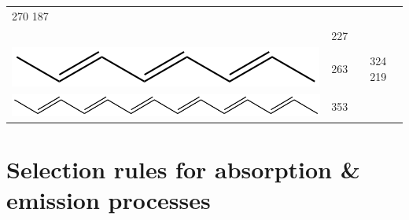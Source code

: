 \documentclass[
]{book}
\begin{document}
\begin{longtable}[]{@{}llll@{}}
\begin{minipage}[t]{0.22\columnwidth}
270 187\strut
\end{minipage}\tabularnewline
\begin{minipage}[t]{0.22\columnwidth}\raggedright
\strut
\end{minipage} & \begin{minipage}[t]{0.22\columnwidth}\raggedright
227\strut
\end{minipage} & \begin{minipage}[t]{0.22\columnwidth}\raggedright
\strut
\end{minipage} & \begin{minipage}[t]{0.22\columnwidth}\raggedright
\strut
\end{minipage}\tabularnewline
\begin{minipage}[t]{0.22\columnwidth}\raggedright
\includegraphics{images/octatrienestructure.png}\strut
\end{minipage} & \begin{minipage}[t]{0.22\columnwidth}\raggedright
263\strut
\end{minipage} & \begin{minipage}[t]{0.22\columnwidth}\raggedright
\strut
\end{minipage} & \begin{minipage}[t]{0.22\columnwidth}\raggedright
324 219\strut
\end{minipage}\tabularnewline
\begin{minipage}[t]{0.22\columnwidth}\raggedright
\includegraphics{images/longene.png}\strut
\end{minipage} & \begin{minipage}[t]{0.22\columnwidth}\raggedright
353\strut
\end{minipage} & \begin{minipage}[t]{0.22\columnwidth}\raggedright
\strut
\end{minipage} & \begin{minipage}[t]{0.22\columnwidth}\raggedright
\strut
\end{minipage}\tabularnewline
\bottomrule
\end{longtable}

\hypertarget{sec:selectionrules}{%
\section{Selection rules for absorption \& emission processes}\label{sec:selectionrules}}
\end{document}
